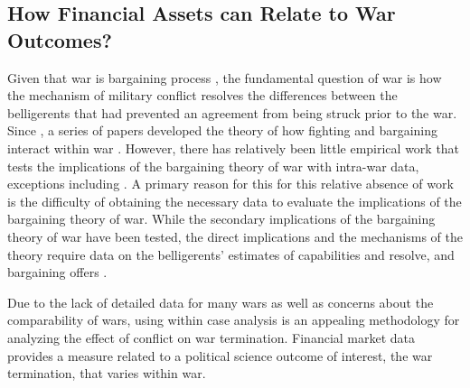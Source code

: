 \subsection{How Financial Assets can Relate to War Outcomes?}
\label{bonds_battles:sec:how-financial-assets}

Given that war is bargaining process \parencite{Fearon1995}, the fundamental question of war is how the mechanism of military conflict resolves the differences between the belligerents that had prevented an agreement from being struck prior to the war.
Since \textcite{Fearon1995}, a series of papers developed the theory of how fighting and bargaining interact within war \parencites{FilsonWerner2002}{Slantchev2003}{SmithStam2004}{Powell2004}{LeventogluSlantchev2007}{LangloisLanglois2009}{WolfordReiterCarrubba2011}.
However, there has relatively been little empirical work that tests the implications of the bargaining theory of war with intra-war data, exceptions including \textcites{Goemans2000}{Ramsay2008}{Reiter2009}{Weisiger2013}{Weisiger2015}.
A primary reason for this for this relative absence of work is the difficulty of obtaining the necessary data to evaluate the implications of the bargaining theory of war.
While the secondary implications of the bargaining theory of war have been tested, the direct implications and the mechanisms of the theory require data on the belligerents' estimates of capabilities and resolve, and bargaining offers \parencite[32]{Reiter2003}.


Due to the lack of detailed data for many wars as well as concerns about the comparability of wars, using within case analysis is an appealing methodology for analyzing the effect of conflict on war termination.
Financial market data provides a measure related to a political science outcome of interest, the war termination, that varies within war.

